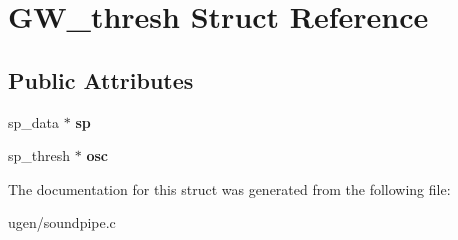 \hypertarget{structGW__thresh}{}\section{G\+W\+\_\+thresh Struct Reference}
\label{structGW__thresh}
\subsection*{Public Attributes}
\begin{DoxyCompactItemize}
\item 
\hypertarget{structGW__thresh_a28bdf273c574b4380b34c563b6301703}{}\label{structGW__thresh_a28bdf273c574b4380b34c563b6301703} 
sp\+\_\+data $\ast$ {\bfseries sp}
\item 
\hypertarget{structGW__thresh_a094c82c0f84ca3dee059dfc8ee62ccf9}{}\label{structGW__thresh_a094c82c0f84ca3dee059dfc8ee62ccf9} 
sp\+\_\+thresh $\ast$ {\bfseries osc}
\end{DoxyCompactItemize}


The documentation for this struct was generated from the following file\+:\begin{DoxyCompactItemize}
\item 
ugen/soundpipe.\+c\end{DoxyCompactItemize}
